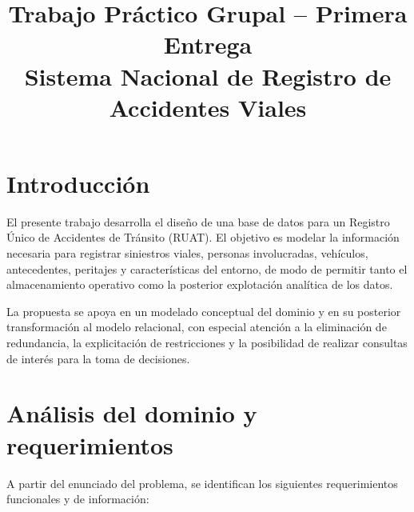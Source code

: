 \documentclass[12pt,a4paper]{article}
\title{Trabajo Práctico Grupal -- Primera Entrega\\Sistema Nacional de Registro de Accidentes Viales}
\author{}
\date{}
\begin{document}
\maketitle

\section{Introducción}

El presente trabajo desarrolla el diseño de una base de datos para un Registro Único de Accidentes de Tránsito (RUAT). El objetivo es modelar la información necesaria para registrar siniestros viales, personas involucradas, vehículos, antecedentes, peritajes y características del entorno, de modo de permitir tanto el almacenamiento operativo como la posterior explotación analítica de los datos.

La propuesta se apoya en un modelado conceptual del dominio y en su posterior transformación al modelo relacional, con especial atención a la eliminación de redundancia, la explicitación de restricciones y la posibilidad de realizar consultas de interés para la toma de decisiones.

\section{Análisis del dominio y requerimientos}

A partir del enunciado del problema, se identifican los siguientes requerimientos funcionales y de información:
\end{document}
